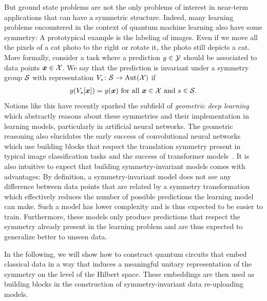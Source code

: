 \documentclass[a4paper,twocolumn,notitlepage,nofootinbib,superscriptaddress,floatfix]{revtex4-2}
\begin{document}
But ground state problems are not the only problems of interest in near-term applications that can have a symmetric structure. 
Indeed, many learning problems encountered in the context of quantum machine learning also have some symmetry: A prototypical example is the labeling of images. Even if we move all the pixels of a cat photo to the right or rotate it, the photo still depicts a cat. More formally, consider a task where a prediction $y \in \mathcal{Y}$ should be associated to data points $\boldsymbol{x} \in \mathcal{X}$. We say that the prediction is invariant under a symmetry group $\mathcal{S}$ with representation $V_s\colon \mathcal{S} \to \operatorname{Aut}(\mathcal{X})$ if 
\begin{align}\label{eqn:invariance_of_prediction}
    y(V_s[\boldsymbol{x}]) = y(\boldsymbol{x})  \text{ for all } \boldsymbol{x} \in \mathcal{X} \text{ and } s \in \mathcal{S}.
\end{align}
Notions like this have recently sparked the subfield of \emph{geometric deep learning}~\cite{bronstein2021geometric} which abstractly reasons about these symmetries and their implementation in learning models, particularly in artificial neural networks. The geometric reasoning also elucidates the early success of convolutional neural networks~\cite{lecun1989backpropagation} which use building blocks that respect the translation symmetry present in typical image classification tasks and the success of transformer models~\cite{vaswani2017attention}. It is also intuitive to expect that building symmetry-invariant models comes with advantages: By definition, a symmetry-invariant model does not see any difference between data points that are related by a symmetry transformation which effectively reduces the number of possible predictions the learning model can make. Such a model has lower complexity and is thus expected to be easier to train. Furthermore, these models only produce predictions that respect the symmetry already present in the learning problem and are thus expected to generalize better to unseen data.

In the following, we will show how to construct quantum circuits that embed classical data in a way that induces a meaningful unitary representation of the symmetry on the level of the Hilbert space. These embeddings are then used as building blocks in the construction of symmetry-invariant data re-uploading models.
\end{document}
